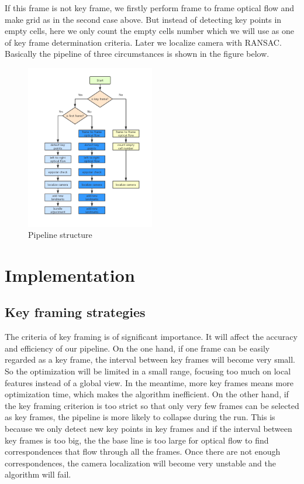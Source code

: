 \documentclass[conference]{IEEEtran}
\begin{document}
If this frame is not key frame, we firstly perform frame to frame optical flow and make grid as in the second case above. But instead of detecting key points in empty cells, here we only count the empty cells number which we will use as one of key frame determination criteria. Later we localize camera with RANSAC.\\

Basically the pipeline of three circumstances is shown in the figure below.

\begin{figure}[h!]
\centering
\includegraphics[width=0.5\textwidth]{img/flowchart.png}
\caption{Pipeline structure}
\label{fig:pipeline structure}
\end{figure}

\section{Implementation}
\subsection{Key framing strategies}
The criteria of key framing is of significant importance. It will affect the accuracy and efficiency of our pipeline. On the one hand, if one frame can be easily regarded as a key frame, the interval between key frames will become very small. So the optimization will be limited in a small range, focusing too much on local features instead of a global view. In the meantime, more key frames means more optimization time, which makes the algorithm inefficient. On the other hand, if the key framing criterion is too strict so that only very few frames can be selected as key frames, the pipeline is more likely to collapse during the run. This is because we only detect new key points in key frames and if the interval between key frames is too big, the the base line is too large for optical flow to find correspondences that flow through all the frames. Once there are not enough correspondences, the camera localization will become very unstable and the algorithm will fail.\\
\end{document}
